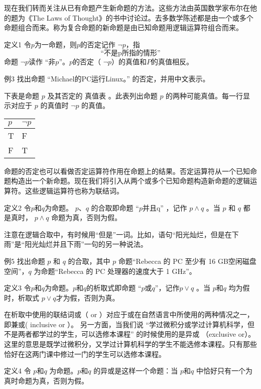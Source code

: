 现在我们转而关注从已有命题产生新命题的方法。这些方法由英国数学家布尔在他的题为《The Laws of Thought》的书中讨论过。去多数学陈述都是由一个或多个命题组合而来。称为复合命题的新命题是由已知命题用逻辑运算符组合而来。  

定义1  令$p$为一命题，则$p$的否定记作 $\neg p$，指
\[
	“\mbox{不是p所指的情形}”
\]
命题 $\neg p$读作 “非$p$”。$p$的否定（ $\neg p$）的真值和$P$的真值相反。  

例3  找出命题
“Michael的PC运行Linux。” 
的否定，并用中文表示。

下表是命题 $p$ 及其否定的 真值表 。此表列出命题 $p$ 的两种可能真值。每一行显示对应于 $p$ 的真值时 $\neg p$ 的真值。  

\begin{table}[h]
	\centering
	\begin{tabular}{l|l}
		\hline
		$p$ & $\neg p$ \\
		\hline
		T & F	\\
		F & T \\
		\hline
	\end{tabular}
\end{table}
		

命题的否定也可以看做否定运算符作用在命题上的结果。否定运算符从一个已知命题构造出一个新命题。现在我们将引入从两个或多个已知命题构造新命题的逻辑运算符。这些逻辑运算符也称为联结词。

定义2  令$p$和$q$为命题。
$p$、$q$
的合取即命题 “$p\mbox{并且q}$” ，记作 
$p \land q$ 
。当 $p$ 和 $q$ 都是真时，
$p \land q$
命题为真，否则为假。  

注意在逻辑合取中，有时候用“但是”一词。比如，语句“阳光灿烂，但是在下雨”是“阳光灿烂并且下雨”一句的另一种说法。  

例5  找出命题 $p$ 和 $q$ 的合取，其中 $p$ 命题“Rebecca 的 PC 至少有 16 GB空闲磁盘空间”，$q$ 为命题“Rebecca 的 PC 处理器的速度大于 1 GHz”。  

定义3  令$p$和$q$为命题。$p和q$的析取式即命题 “$p\mbox{或}q$”，记作$p \lor q$ 。当 $p\mbox{和}q$ 均为假时，析取式 $p\lor q$才为假，否则为真。  

在析取中使用的联结词或（ or ）对应于或在自然语言中所使用的两种情况之一，即兼或( inclusive or ）。  
另一方面，当我们说
 “学过微积分或学过计算机科学，但不是两者都学过的学生，可以选修本课程”
的时候使用的是异或 （exclusive or）。这里的意思是既学过微积分，又学过计算机科学的学生不能选修本课程。只有那些恰好在这两门课中修过一门的学生可以选修本课程。

定义4  令 $p和q$ 为命题。$p\mbox{和}q$ 的异或是这样一个命题：当 $p\mbox{和}q$ 中恰好只有一个为真时命题为真，否则为假。

